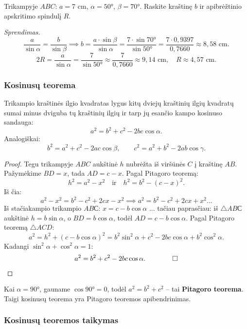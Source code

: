 \begin{example}
Trikampyje $ABC$: $a = 7$ cm, $\alpha = 50°$, $\beta = 70°$.
Raskite kraštinę $b$ ir apibrėžtinio apskritimo spindulį $R$.

\textit{Sprendimas.}
\[
\frac{a}{\sin\alpha} = \frac{b}{\sin\beta}
\implies b = \frac{a \cdot \sin\beta}{\sin\alpha}
= \frac{7 \cdot \sin 70°}{\sin 50°}
= \frac{7 \cdot 0{,}9397}{0{,}7660}
\approx 8{,}58 \text{ cm}.
\]
\[
2R = \frac{a}{\sin\alpha} = \frac{7}{\sin 50°} \approx \frac{7}{0{,}7660} \approx 9{,}14 \text{ cm},
\quad R \approx 4{,}57 \text{ cm}.
\]
\end{example}

\subsubsection*{Kosinusų teorema}

\begin{theorem}
Trikampio kraštinės ilgio kvadratas lygus kitų dviejų kraštinių ilgių kvadratų sumai
minus dviguba tų kraštinių ilgių ir tarp jų esančio kampo kosinuso sandauga:
\[
\boxed{a^2 = b^2 + c^2 - 2bc\cos\alpha.}
\]
Analogiškai:
\[
b^2 = a^2 + c^2 - 2ac\cos\beta, \qquad
c^2 = a^2 + b^2 - 2ab\cos\gamma.
\]
\end{theorem}

\begin{proof}
Tegu trikampyje $ABC$ aukštinė $h$ nubrėžta iš viršūnės $C$ į kraštinę $AB$.
Pažymėkime $BD = x$, tada $AD = c - x$. Pagal Pitagoro teoremą:
\[
h^2 = a^2 - x^2 \quad \text{ir} \quad h^2 = b^2 - (c-x)^2.
\]
Iš čia:
\[
a^2 - x^2 = b^2 - c^2 + 2cx - x^2
\implies a^2 = b^2 - c^2 + 2cx + x^2... 
\]
Iš stačiakampio trikampio $ABС$: $x = c - b\cos\alpha$ ... tačiau paprasčiau:
iš $\triangle ABС$ aukštinė $h = b\sin\alpha$, o $BD = b\cos\alpha$, todėl
$AD = c - b\cos\alpha$. Pagal Pitagoro teoremą $\triangle ACD$:
\[
a^2 = h^2 + (c - b\cos\alpha)^2
= b^2\sin^2\alpha + c^2 - 2bc\cos\alpha + b^2\cos^2\alpha.
\]
Kadangi $\sin^2\alpha + \cos^2\alpha = 1$:
\[
a^2 = b^2 + c^2 - 2bc\cos\alpha. \qquad \qed
\]
\end{proof}

\begin{remark}
Kai $\alpha = 90°$, gauname $\cos 90° = 0$, todėl $a^2 = b^2 + c^2$ –
tai \textbf{Pitagoro teorema}. Taigi kosinusų teorema yra Pitagoro teoremos apibendrinimas.
\end{remark}

\subsubsection*{Kosinusų teoremos taikymas}

